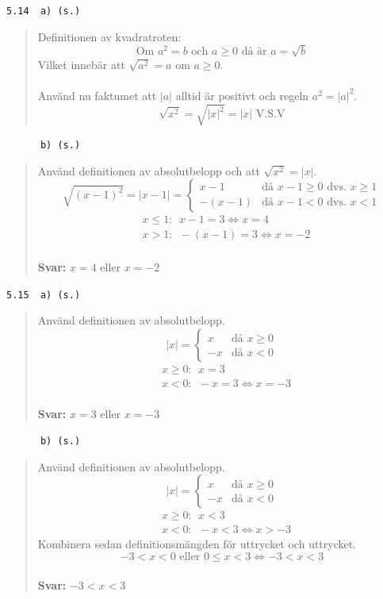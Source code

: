 \documentclass[a4paper]{article}
\newcommand{\tskcol}[1]{\textcolor{tskcol}{#1}}
\begin{document}
	\texttt{\tskcol{5.14~~a) (s.)}}
	\begin{quotation}
		\noindent
		Definitionen av kvadratroten:
		\[\text{Om } a^2 = b \text{ och } a \ge 0 \text{ då är } a = \sqrt{b}\]
		Vilket innebär att $\sqrt{a^2} = a$ om $a \ge 0$. \\ \\
		Använd nu faktumet att $|a|$ alltid är positivt och regeln $a^2=|a|^2$.
		\[\sqrt{x^2}=\sqrt{|x|^2}=|x| \text{ V.S.V}\]
	\end{quotation}
	
	\texttt{\tskcol{~~~~~~b) (s.)}}
	\begin{quotation}
		\noindent
		Använd definitionen av absolutbelopp och att $\sqrt{x^2}=|x|$.
		\[\sqrt{(x-1)^2}=
		|x-1|=
		\begin{cases}
		x-1&    \text{då } x-1 \ge 0 \text{ dvs. } x \ge 1\\
		-(x-1)& \text{då } x-1 < 0   \text{ dvs. } x < 1
		\end{cases}\]
		\begin{align*}
		& x \le 1:~~ x-1=3 \Leftrightarrow x=4 \\
		& x > 1:~~ -(x-1)=3 \Leftrightarrow x=-2
		\end{align*}
		\\
		\textbf{Svar:} $x=4$ eller $x=-2$
	\end{quotation}
	
	\texttt{\tskcol{5.15~~a) (s.)}}
	\begin{quotation}
		\noindent
		Använd definitionen av absolutbelopp.
		\[|x|=
		\begin{cases}
		x& \text{då } x \ge 0 \\
		-x& \text{då } x < 0
		\end{cases}\]
		\begin{align*}
		& x \ge 0:~~ x=3 \\
		& x < 0:~~ -x=3 \Leftrightarrow x=-3
		\end{align*}
		\\
		\textbf{Svar:} $x=3$ eller $x=-3$
	\end{quotation}
	
	\texttt{\tskcol{~~~~~~b) (s.)}}
	\begin{quotation}
		\noindent
		Använd definitionen av absolutbelopp.
		\[|x|=
		\begin{cases}
		x& \text{då } x \ge 0 \\
		-x& \text{då } x < 0
		\end{cases}\]
		\begin{align*}
		& x \ge 0:~~ x<3 \\
		& x < 0:~~ -x<3 \Leftrightarrow x>-3
		\end{align*}
		Kombinera sedan definitionsmängden för uttrycket och uttrycket.
		\[-3 < x < 0 \text{ eller } 0 \le x < 3 \Leftrightarrow -3 < x < 3\]
		\\
		\textbf{Svar:} $-3 < x < 3$
	\end{quotation}
	
\end{document}

